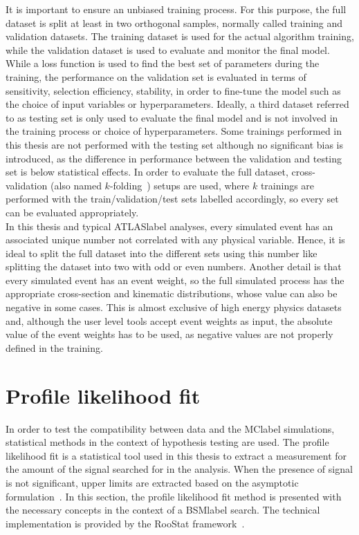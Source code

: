 It is important to ensure an unbiased training process. For this purpose, the full dataset is split at least in two orthogonal samples, normally called training and validation datasets. The training dataset is used for the actual algorithm training, while the validation dataset is used to evaluate and monitor the final model. While a loss function is used to find the best set of parameters during the training, the performance on the validation set is evaluated in terms of sensitivity, selection efficiency, stability, in order to fine-tune the model such as the choice of input variables or hyperparameters. Ideally, a third dataset referred to as testing set is only used to evaluate the final model and is not involved in the training process or choice of hyperparameters. Some trainings performed in this thesis are not performed with the testing set although no significant bias is introduced, as the difference in performance between the validation and testing set is below statistical effects. In order to evaluate the full dataset, cross-validation (also named $k$-folding~\cite{EncyclopediaofML}) setups are used, where $k$ trainings are performed with the train/validation/test sets labelled accordingly, so every set can be evaluated appropriately.\\

In this thesis and typical \acrshort{ATLASlabel} analyses, every simulated event has an associated unique number not correlated with any physical variable. Hence, it is ideal to split the full dataset into the different sets using this number like splitting the dataset into two with odd or even numbers. Another detail is that every simulated event has an event weight, so the full simulated process has the appropriate cross-section and kinematic distributions, whose value can also be negative in some cases. This is almost exclusive of high energy physics datasets and, although the user level tools accept event weights as input, the absolute value of the event weights has to be used, as negative values are not properly defined in the training.

\section{Profile likelihood fit}
\label{sec:profilelikelihoodfit}

In order to test the compatibility between data and the \acrshort{MClabel} simulations, statistical methods in the context of hypothesis testing are used. The profile likelihood fit is a statistical tool used in this thesis to extract a measurement for the amount of the signal searched for in the analysis. When the presence of signal is not significant, upper limits are extracted based on the asymptotic formulation~\cite{Cowan_2011}. In this section, the profile likelihood fit method is presented with the necessary concepts in the context of a \acrshort{BSMlabel} search.
The technical implementation is provided by the RooStat framework~\cite{10.48550/arxiv.1009.1003}.\\

